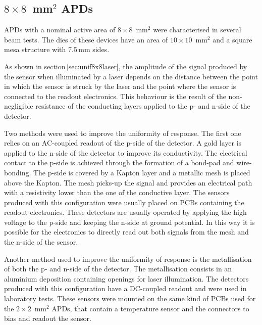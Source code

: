 \documentclass{article}
\begin{document}
\subsection{$8 \times 8$~mm$^2$ APDs}

APDs with a nominal active area of $8 \times 8$~mm$^2$ were characterised in several beam tests.
The dies of these devices have an area of $10 \times 10$~mm$^2$ and a square mesa structure with 7.5\,mm sides.

As shown in section\,\ref{sec:unif8x8laser}, the amplitude of the signal produced by the sensor when illuminated by a laser depends on the distance between the point in which the sensor is struck by the laser and the point where the sensor is connected to the readout electronics.
This behaviour is the result of the non-negligible resistance of the conducting layers applied to the p- and n-side of the detector.

Two methods were used to improve the uniformity of response.
The first one relies on an AC-coupled readout of the p-side of the detector.
A gold layer is applied to the n-side of the detector to improve its conductivity.
The electrical contact to the p-side is achieved through the formation of a bond-pad and wire-bonding.
The p-side is covered by a Kapton layer and a metallic mesh is placed above the Kapton.
The mesh picks-up the signal and provides an electrical path with a resistivity lower than the one of the conductive layer.
The sensors produced with this configuration were usually placed on PCBs containing the readout electronics.
These detectors are usually operated by applying the high voltage to the p-side and keeping the n-side at ground potential.
In this way it is possible for the electronics to directly read out both signals from the mesh and the n-side of the sensor.

Another method used to improve the uniformity of response is the metallisation of both the p- and n-side of the detector.
The metallisation consists in an aluminium deposition containing openings for laser illumination.
The detectors produced with this configuration have a DC-coupled readout and were used in laboratory tests.
These sensors were mounted on the same kind of PCBs used for the $2 \times 2$~mm$^2$ APDs, that contain a temperature sensor and the connectors to bias and readout the sensor.
\end{document}
